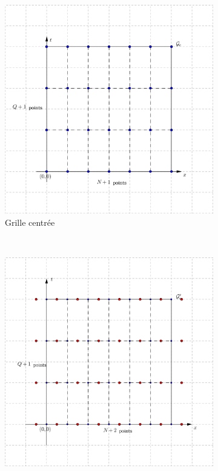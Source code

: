 \documentclass[a4paper,12pt]{article}
\begin{document}
\begin{figure}[!h]
\centering
	\begin{subfigure}[b]{0.3\linewidth}
	\centering
	\includegraphics[width=0.9\linewidth]{img/grille_centree.png}
	\caption{Grille centrée}
	\label{fig:centered}
	\end{subfigure}
	~
	\begin{subfigure}[b]{0.3\linewidth}
	\centering
	\includegraphics[width=0.9\linewidth]{img/grille_decentree_x.png}

\end{subfigure}
\end{figure}
\end{document}
